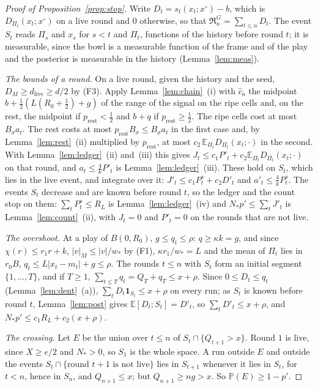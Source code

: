 \documentclass[11pt]{amsart}
\theoremstyle{definition}
\numberwithin{equation}{section}
\newcommand{\E}{\mathbb{E}}
\newcommand{\Prob}{\mathbb{P}}
\newcommand{\Reg}{\mathfrak{R}}
\begin{document}
\begin{proof}[Proof of Proposition~\ref{prop:stop}]
Write $D_t=s_t(x_t;x^\circ)-b$, which is $D_{\Pi_t}(x_t;x^\circ)$ on a live round and $0$ otherwise, so that $\Reg^G_n=\sum_{t\le n}D_t$. The event $S_t$ reads $\Pi_s$ and $x_s$ for $s<t$ and $\Pi_t$, functions of the history before round $t$; it is measurable, since the bowl is a measurable function of the frame and of the play and the posterior is measurable in the history (Lemma~\ref{lem:meas}).

\emph{The bounds of a round.} On a live round, given the history and the seed, $D_M\ge d_{\mathrm{live}}\ge d/2$ by (F3). Apply Lemma~\ref{lem:chain}~(i) with $\hat c_a$ the midpoint $b+\frac12(L(R_0+\frac12)+g)$ of the range of the signal on the ripe cells and, on the rest, the midpoint if $p_{\mathrm{rest}}<\frac12$ and $b+q$ if $p_{\mathrm{rest}}\ge\frac12$. The ripe cells cost at most $B_\sigma a_t$. The rest costs at most $p_{\mathrm{rest}}B_\sigma\le B_\sigma a_t$ in the first case and, by Lemma~\ref{lem:rest}~(ii) multiplied by $p_{\mathrm{rest}}$, at most $c_2\,\E_{\Pi_t}D_{\Pi_t}(x_t;\cdot)$ in the second. With Lemma~\ref{lem:ledger}~(ii) and~(iii) this gives $J_t\le c_1P'_t+c_2\E_{\Pi_t}D_{\Pi_t}(x_t;\cdot)$ on that round, and $a_t\le\frac4kP'_t$ is Lemma~\ref{lem:ledger}~(iii). These hold on $S_t$, which lies in the live event, and integrate over it: $J'_t\le c_1P^s_t+c_2D'_t$ and $a'_t\le\frac4kP^s_t$. The events $S_t$ decrease and are known before round $t$, so the ledger and the count stop on them: $\sum_tP^s_t\le R_L$ is Lemma~\ref{lem:ledger}~(iv) and $N_*p'\le\sum_tJ'_t$ is Lemma~\ref{lem:count}~(ii), with $J_t=0$ and $P'_t=0$ on the rounds that are not live.

\emph{The overshoot.} At a play of $B(0,R_0)$, $g\le q_t\le\rho$: $q\ge\kappa k=g$, and since $\chi(r)\le r_1r+k$, $|v|_M\le|v|/w_*$ by (F1), $\kappa r_1/w_*=L$ and the mean of $\Pi_t$ lies in $r_0B$, $q_t\le L|x_t-m_t|+g\le\rho$. The rounds $t\le n$ with $S_t$ form an initial segment $\{1,\dots,T\}$, and if $T\ge1$, $\sum_{t\le T}q_t=Q_T+q_T\le x+\rho$. Since $0\le D_t\le q_t$ (Lemma~\ref{lem:dent}~(a)), $\sum_tD_t\mathbf 1_{S_t}\le x+\rho$ on every run; as $S_t$ is known before round $t$, Lemma~\ref{lem:post} gives $\E[D_t;S_t]=D'_t$, so $\sum_tD'_t\le x+\rho$, and $N_*p'\le c_1R_L+c_2(x+\rho)$.

\emph{The crossing.} Let $E$ be the union over $t\le n$ of $S_t\cap\{Q_{t+1}>x\}$. Round $1$ is live, since $X\ge e/2$ and $N_*>0$, so $S_1$ is the whole space. A run outside $E$ and outside the events $S_t\cap\{\text{round }t+1\text{ is not live}\}$ lies in $S_{t+1}$ whenever it lies in $S_t$, for $t<n$, hence in $S_n$, and $Q_{n+1}\le x$; but $Q_{n+1}\ge ng>x$. So $\Prob(E)\ge1-p'$.


\end{proof}
\end{document}
